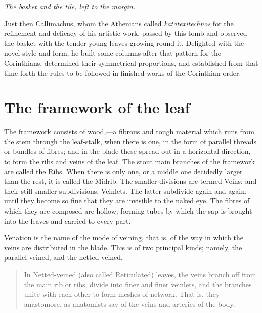 \documentclass[11pt,twoside]{article}
\begin{document}
\vspace{5.2cm}
\begin{center}\small\itshape The basket and the tile, left to the margin.\end{center}

Just then Callimachus, whom the Athenians called \emph{katatexitechnos} for
the refinement and delicacy of his artistic work, passed by this tomb and
observed the basket with the tender young leaves growing round it.
Delighted with the novel style and form, he built some columns after that
pattern for the Corinthians, determined their symmetrical proportions, and
established from that time forth the rules to be followed in finished
works of the Corinthian order.

\section{The framework of the leaf}

The framework consists of wood,---a fibrous and tough material which runs
from the stem through the leaf-stalk, when there is one, in the form of
parallel threads or bundles of fibres; and in the blade these spread out in
a horizontal direction, to form the ribs and veins of the leaf. The stout
main branches of the framework are called the Ribs. When there is only one,
or a middle one decidedly larger than the rest, it is called the Midrib.
The smaller divisions are termed Veins; and their still smaller
subdivisions, Veinlets. The latter subdivide again and again, until they
become so fine that they are invisible to the naked eye. The fibres of
which they are composed are hollow; forming tubes by which the sap is
brought into the leaves and carried to every part.

Venation is the name of the mode of veining, that is, of the way in which
the veins are distributed in the blade. This is of two principal kinds;
namely, the parallel-veined, and the netted-veined.

\begin{quote}
In Netted-veined (also called Reticulated) leaves, the veins branch off
from the main rib or ribs, divide into finer and finer veinlets, and the
branches unite with each other to form meshes of network. That is, they
anastomose, as anatomists say of the veins and arteries of the body.
\end{quote}
\end{document}
